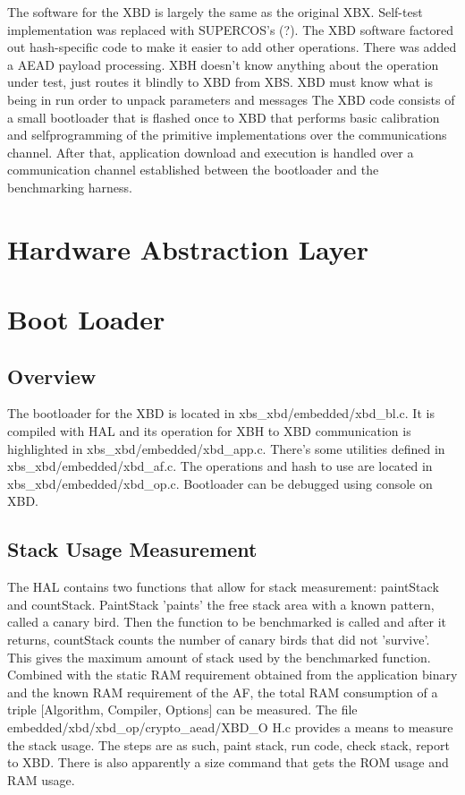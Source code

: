 \documentclass[twoside,11pt]{cergdoc}
\begin{document}
The software for the XBD is largely the same
as the original XBX. Self-test implementation was
replaced with SUPERCOS's (?). The XBD
software factored out hash-specific code to
make it easier to add other operations. There
was added a AEAD payload processing.
XBH doesn't know anything about the
operation under test, just routes it blindly to
XBD from XBS. XBD must know what is
being in run order to unpack
parameters and messages
The XBD code consists of a small
bootloader that is flashed once to XBD that
performs basic calibration and selfprogramming
of the primitive
implementations over the communications
channel. After that, application download
and execution is handled over a
communication channel established between
the bootloader and the benchmarking
harness.

\chapter{Hardware Abstraction Layer}
\chapter{Boot Loader}
  \section{Overview}
The bootloader for the XBD is
located in xbs\_xbd/embedded/xbd\_bl.c. It is
compiled with HAL and its operation for
XBH to XBD communication is highlighted
in xbs\_xbd/embedded/xbd\_app.c. There’s
some utilities defined in
xbs\_xbd/embedded/xbd\_af.c. The operations
and hash to use are located in
xbs\_xbd/embedded/xbd\_op.c. Bootloader
can be debugged using console on XBD.

  \section{Stack Usage Measurement}
The HAL contains two functions that
allow for stack measurement: paintStack and
countStack. PaintStack ’paints’ the free
stack area with a known pattern, called a
canary bird. Then the function to be
benchmarked is called and after it returns,
countStack counts the number of canary
birds that did not ’survive’. This gives the
maximum amount of stack used by the
benchmarked function. Combined with the
static RAM requirement obtained from the
application binary and the known RAM
requirement of the AF, the total RAM
consumption of a triple [Algorithm,
Compiler, Options] can be measured.
The file
embedded/xbd/xbd\_op/crypto\_aead/XBD\_O
H.c provides a means to measure the stack
usage. The steps are as such, paint stack, run
code, check stack, report to XBD. There is
also apparently a size command that gets the
ROM usage and RAM usage.
\end{document}
